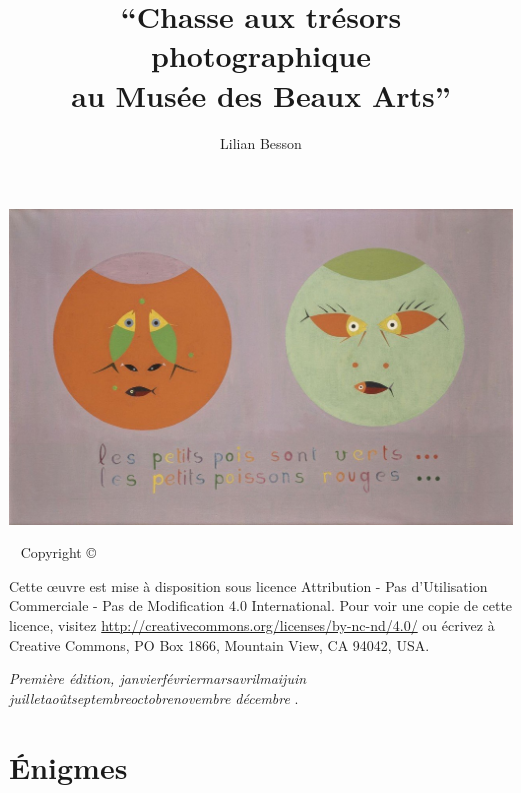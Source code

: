 \documentclass[a4paper,12pt,justified,twoside,notoc]{tufte-book}
\title[Chasse aux trésors photographique au Musée des Beaux Arts]{``Chasse aux trésors photographique \\ au Musée des Beaux Arts''}
\author[Lilian]{Lilian Besson}
\newcommand{\monthyear}{%
  \ifcase\month\or janvier\or février\or mars\or avril\or mai\or juin\or
  juillet\or août\or septembre\or octobre\or novembre\or
  décembre\fi\space\number\year
}
\newcommand{\blankpage}{\newpage\hbox{}\thispagestyle{empty}\newpage}
\begin{document}
\maketitle


\newpage
\begin{fullwidth}

\begin{center}
  \includegraphics[width=1.1\textwidth]{les_petits_pois_sont_verts.jpeg}
\end{center}

~
\vfill
\thispagestyle{empty}
\setlength{\parindent}{0pt}
\setlength{\parskip}{\baselineskip}
Copyright \copyright\ \the\year\ \thanklessauthor


\par Cette œuvre est mise à disposition sous licence Attribution - Pas d'Utilisation Commerciale - Pas de Modification 4.0 International. Pour voir une copie de cette licence, visitez \url{http://creativecommons.org/licenses/by-nc-nd/4.0/} ou écrivez à Creative Commons, PO Box 1866, Mountain View, CA 94042, USA.

\par\textit{Première édition, \monthyear}.
\end{fullwidth}

\setcounter{tocdepth}{2}

\begin{large}
  \tableofcontents
\end{large}



\cleardoublepage



\cleardoublepage
\chapter{Énigmes}

\begin{fullwidth}

\end{fullwidth}


\cleardoublepage


\newpage
\blankpage
\end{document}
